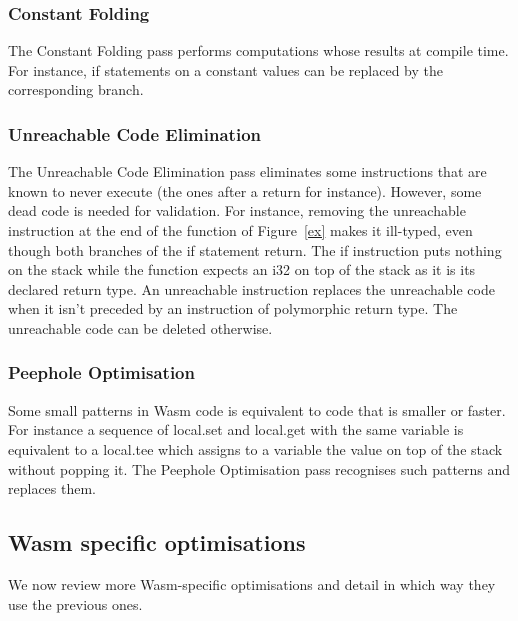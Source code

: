 \documentclass[a4paper,11pt]{article}
\begin{document}
\subsubsection{Constant Folding}
The Constant Folding pass performs computations whose results at compile time.
For instance, if statements on a constant values can be replaced by the
corresponding branch.

\subsubsection{Unreachable Code Elimination}
The Unreachable Code Elimination pass eliminates some instructions that are
known to never execute (the ones after a \textsf{return} for instance). However,
some dead code is needed for validation. For instance, removing the
\textsf{unreachable} instruction at the end of the function of Figure~\ref{ex}
makes it ill-typed, even though both branches of the if statement return. The
\textsf{if} instruction puts nothing on the stack while the function expects an
\textsf{i32} on top of the stack as it is its declared return type. An
\textsf{unreachable} instruction replaces the unreachable code when it isn't
preceded by an instruction of polymorphic return type. The unreachable code can
be deleted otherwise.

\subsubsection{Peephole Optimisation}
Some small patterns in Wasm code is equivalent to code that is smaller or
faster. For instance a sequence of \textsf{local.set} and \textsf{local.get}
with the same variable is equivalent to a \textsf{local.tee} which assigns to a
variable the value on top of the stack without popping it. The Peephole
Optimisation pass recognises such patterns and replaces them.


\subsection{Wasm specific optimisations}
We now review more Wasm-specific optimisations and detail in which way they use
the previous ones.
\end{document}
